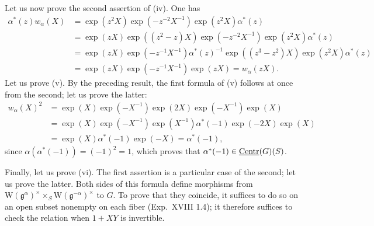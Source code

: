Let us now prove the second assertion of (iv). One has{\renewcommand{\thefootnote}{(26)}}
\[
\begin{aligned}
\alpha^*(z)w_\alpha(X)&=\exp(z^2X)\exp(-z^{-2}X^{-1})\exp(z^2X)\alpha^*(z)\\
&=\exp(zX)\exp((z^2-z)X)\exp(-z^{-2}X^{-1})\exp(z^2X)\alpha^*(z)\\
&=\exp(zX)\exp(-z^{-1}X^{-1})\alpha^*(z)^{-1}\exp((z^3-z^2)X)\exp(z^2X)\alpha^*(z)\\
&=\exp(zX)\exp(-z^{-1}X^{-1})\exp(zX)=w_\alpha(zX).
\end{aligned}
\]
Let us prove (v). By the preceding result, the first formula of (v) follows at once from the second; let us prove the latter:
\[
\begin{aligned}
w_\alpha(X)^2&=\exp(X)\exp(-X^{-1})\exp(2X)\exp(-X^{-1})\exp(X)\\
&=\exp(X)\exp(-X^{-1})\exp(X^{-1})\alpha^*(-1)\exp(-2X)\exp(X)\\
&=\exp(X)\alpha^*(-1)\exp(-X)=\alpha^*(-1),
\end{aligned}
\]
since $\alpha(\alpha^*(-1))=(-1)^2=1$, which proves that $\alpha^*(-1)\in\underline{\mathrm{Centr}}(G)(S)$.

Finally, let us prove (vi). The first assertion is a particular case of the second; let us prove the latter. Both sides of this formula define morphisms from $\mathrm W(\mathfrak g^\alpha)^\times\times_S\mathrm W(\mathfrak g^{-\alpha})^\times$ to $G$. To prove that they coincide, it suffices to do so on an open subset nonempty on each fiber (Exp.~XVIII 1.4); it therefore suffices to check the relation when $1+XY$ is invertible.
